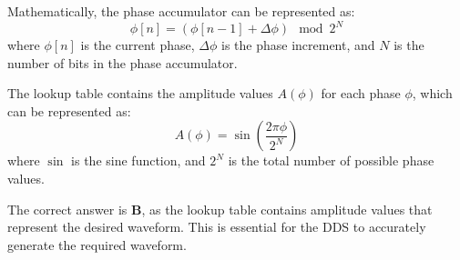Mathematically, the phase accumulator can be represented as:
\[
\phi[n] = (\phi[n-1] + \Delta\phi) \mod 2^N
\]
where \(\phi[n]\) is the current phase, \(\Delta\phi\) is the phase increment, and \(N\) is the number of bits in the phase accumulator.

The lookup table contains the amplitude values \(A(\phi)\) for each phase \(\phi\), which can be represented as:
\[
A(\phi) = \sin\left(\frac{2\pi\phi}{2^N}\right)
\]
where \(\sin\) is the sine function, and \(2^N\) is the total number of possible phase values.

The correct answer is \textbf{B}, as the lookup table contains amplitude values that represent the desired waveform. This is essential for the DDS to accurately generate the required waveform.

